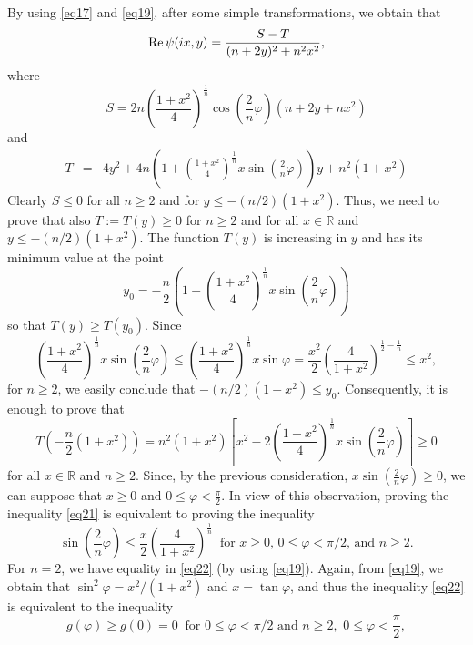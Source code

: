 \documentclass[a4paper,12pt]{amsart}
\theoremstyle{definition}
\begin{document}
By using \eqref{eq17} and \eqref{eq19}, after some simple transformations, we obtain that
$${\rm Re\,} \psi (ix,y)=\frac{S-T}{(n+2y)^{2}+n^{2}x^{2}},
$$
where
$$S=2n\left(\frac{1+x^{2}}{4}\right)^{\frac{1}{n}}\cos\left(\frac{2}{n}\varphi\right)(n+2y +nx^{2})
$$
and
\begin{eqnarray}
T 
&=& 4y^{2}+ 4n\left(1+\left(\frac{1+x^{2}}{4}\right)^{\frac{1}{n}}x\sin\left(\frac{2}{n}\varphi\right)\right)y +n^{2}(1+x^{2})
\label{eq20}
\end{eqnarray}
Clearly  $S\leq 0$ for all $n\geq 2$ and for  $y\leq -(n/2)(1+x^{2})$.
Thus, we need to prove that also $T:=T(y)\geq 0$ for $n\geq 2$ and for all $x\in{{\mathbb R}}$ and  $y\leq -(n/2)(1+x^{2})$.
The function $T(y)$ is increasing in $y$ and  has its minimum value at the point
$$ y_{0}=-\frac{n}{2}\left(1+\left(\frac{1+x^{2}}{4}\right)^{\frac{1}{n}}x\sin\left(\frac{2}{n}\varphi\right)\right)
$$
so that $T(y)\geq T(y_0)$. Since
$$
\left(\frac{1+x^{2}}{4}\right)^{\frac{1}{n}}x\sin\left(\frac{2}{n}\varphi\right)
\leq \left(\frac{1+x^{2}}{4}\right)^{\frac{1}{n}}x\sin \varphi
=\frac{x^{2}}{2}\left(\frac{4}{1+x^{2}}\right)^{\frac{1}{2}-\frac{1}{n}}
\leq  x^{2},
$$
for $n\geq 2$,  we easily conclude that $- (n/2)(1+x^{2})\leq y_{0}$. Consequently, it is enough to prove that
\begin{equation}\label{eq21}
T\left(-\frac{n}{2} (1+x^{2})\right)= n^{2}(1+x^{2})\left [x^{2}
-2\left(\frac{1+x^{2}}{4}\right)^{\frac{1}{n}}x\sin\left(\frac{2}{n}\varphi\right)\right ]\geq 0
\end{equation}
for all  $x\in \mathbb{R}$ and $n\geq 2$.
Since, by the previous consideration, $x\sin\left(\frac{2}{n}\varphi\right)\geq0$, we can suppose that
$x \geq 0$ and $0\leq \varphi<\frac{\pi}{2}$.
In view of this observation, proving the inequality \eqref{eq21} is equivalent to proving the inequality
\begin{equation}\label{eq22}
\sin\left(\frac{2}{n}\varphi\right)\leq\frac{x}{2} \left(\frac{4}{1+x^{2}}\right)^{\frac{1}{n}} ~\mbox{ for $x\geq 0$, $0\leq \varphi<\pi/2$, and $n\geq 2$}.
\end{equation}
For $n=2$, we have equality in \eqref{eq22} (by using \eqref{eq19}).
Again, from \eqref{eq19}, we obtain  that $\sin^{2}\varphi=x^{2}/(1+x^{2})$ and $x=\tan\varphi$, and
thus the inequality \eqref{eq22} is equivalent to the inequality
\begin{equation}\label{eq23}
g(\varphi)\geq g(0)=0 ~\mbox{ for $0\leq \varphi<\pi/2$ and $n\geq 2$}
,\,\,0\leq\varphi<\frac{\pi}{2},
\end{equation}
\end{document}
